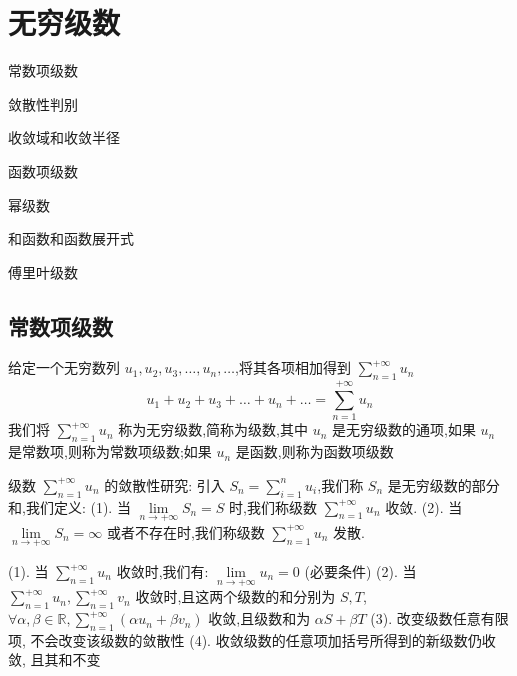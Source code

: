 \chapter{无穷级数}
\begin{introduction}
	\item 常数项级数
	\item 敛散性判别
	\item 收敛域和收敛半径
	\item 函数项级数
	\item 幂级数
	\item 和函数和函数展开式
	\item 傅里叶级数
\end{introduction}
\section{常数项级数}

\begin{definition}[级数定义]
	给定一个无穷数列 $u_{1},u_{2},u_{3},\dots,u_{n},\dots$,将其各项相加得到 $\sum\limits_{n=1}^{+\infty}u_{n}$
	$$u_{1}+u_{2}+u_{3}+\dots+u_{n}+\dots=\sum_{n=1}^{+\infty}u_{n}$$
	我们将 $\sum\limits_{n=1}^{+\infty}u_{n}$ 称为无穷级数,简称为级数,其中 $u_{n}$ 是无穷级数的通项,如果 $u_{n}$ 是常数项,则称为常数项级数;如果 $u_{n}$ 是函数,则称为函数项级数
\end{definition}
\begin{definition}[级数敛散性]
	级数 $\sum\limits_{n=1}^{+\infty}u_{n}$ 的敛散性研究:
	引入 $S_{n}=\sum\limits_{i=1}^{n}u_{i}$,我们称 $S_{n}$ 是无穷级数的部分和,我们定义:
	(1). 当 $\lim\limits_{n\to +\infty}S_{n}=S$ 时,我们称级数 $\sum\limits_{n=1}^{+\infty}u_{n}$ 收敛.
	(2). 当 $\lim\limits_{n\to +\infty}S_{n}=\infty$ 或者不存在时,我们称级数 $\sum\limits_{n=1}^{+\infty}u_{n}$ 发散.
\end{definition}

\begin{corollary}
	(1). 当 $\sum\limits_{n=1}^{+\infty}u_{n}$ 收敛时,我们有:  $\lim\limits_{n\to +\infty}u_{n}=0$ (必要条件)
	(2). 当 $\sum\limits_{n=1}^{+\infty}u_{n},\sum\limits_{n=1}^{+\infty}v_{n}$ 收敛时,且这两个级数的和分别为 $S,T$, $\forall \alpha ,\beta \in \mathbb{R} ,\sum\limits_{n=1}^{+\infty}(\alpha u_{n}+\beta v_{n})$ 收敛,且级数和为 $\alpha S+\beta T$
	(3). 改变级数任意有限项, 不会改变该级数的敛散性
	(4). 收敛级数的任意项加括号所得到的新级数仍收敛, 且其和不变
\end{corollary}

